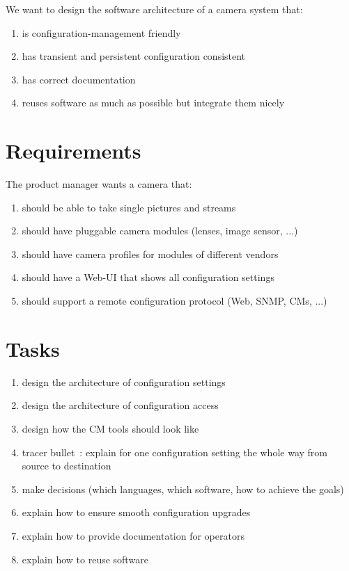 We want to design the software architecture of a camera system that:

\begin{enumerate}
	\item is configuration-management friendly
	\item has transient and persistent configuration consistent
	\item has correct documentation
	\item reuses software as much as possible but integrate them nicely
\end{enumerate}

\section{Requirements}

The product manager wants a camera that:

\begin{enumerate}
	\item should be able to take single pictures and streams
	\item should have pluggable camera modules (lenses, image sensor, ...)
	\item should have camera profiles for modules of different vendors
	\item should have a Web-UI that shows all configuration settings
	\item should support a remote configuration protocol (Web, SNMP, CMs, ...)
\end{enumerate}

\section{Tasks}

\begin{enumerate}
	\item design the architecture of configuration settings
	\item design the architecture of configuration access
	\item design how the CM tools should look like
	\item tracer bullet~\cite{hunt1999pragmatic}: explain for one configuration setting the whole way from source to destination
	\item make decisions (which languages, which software, how to achieve the goals)
	\item explain how to ensure smooth configuration upgrades
	\item explain how to provide documentation for operators
	\item explain how to reuse software
\end{enumerate}



\begingroup
\sloppy
\makeatletter
\g@addto@macro{\UrlBreaks}{\UrlOrds}
\makeatother

\endgroup







